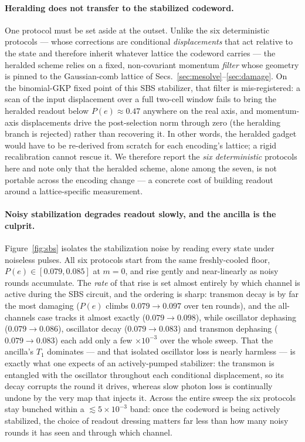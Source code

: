 \documentclass[11pt]{article}
\begin{document}
\paragraph{Heralding does not transfer to the stabilized codeword.} One protocol must be set
aside at the outset. Unlike the six deterministic protocols --- whose corrections are conditional
\emph{displacements} that act relative to the state and therefore inherit whatever lattice the
codeword carries --- the heralded scheme relies on a fixed, non-covariant momentum \emph{filter}
whose geometry is pinned to the Gaussian-comb lattice of Secs.~\ref{sec:mesolve}--\ref{sec:damage}.
On the binomial-GKP fixed point of this SBS stabilizer, that filter is mis-registered: a
scan of the input displacement over a full two-cell window fails to bring the heralded readout below
$P(e)\approx0.47$ anywhere on the real axis, and momentum-axis displacements drive the
post-selection norm through zero (the heralding branch is rejected) rather than recovering it. In
other words, the heralded gadget would have to be re-derived from scratch for each encoding's
lattice; a rigid recalibration cannot rescue it. We therefore report the \emph{six deterministic}
protocols here and note only that the heralded scheme, alone among the seven, is not portable across
the encoding change --- a concrete cost of building readout around a lattice-specific measurement.

\paragraph{Noisy stabilization degrades readout slowly, and the ancilla is the culprit.}
Figure~\ref{fig:sbs} isolates the stabilization noise by reading every state under noiseless
pulses. All six protocols start from the same freshly-cooled floor, $P(e)\in[0.079,0.085]$ at
$m=0$, and rise gently and near-linearly as noisy rounds accumulate. The \emph{rate} of that rise
is set almost entirely by which channel is active during the SBS circuit, and the ordering is
sharp: transmon decay is by far the most damaging ($P(e)$ climbs $0.079\!\to\!0.097$ over ten
rounds), and the all-channels case tracks it almost exactly ($0.079\!\to\!0.098$), while
oscillator dephasing ($0.079\!\to\!0.086$), oscillator decay ($0.079\!\to\!0.083$) and transmon
dephasing ($0.079\!\to\!0.083$) each add only a few $\times10^{-3}$ over the whole sweep. That the
ancilla's $T_1$ dominates --- and that isolated oscillator loss is nearly harmless --- is exactly
what one expects of an actively-pumped stabilizer: the transmon is entangled with the oscillator
throughout each conditional displacement, so its decay corrupts the round it drives, whereas slow
photon loss is continually undone by the very map that injects it. Across the entire sweep the six
protocols stay bunched within a $\lesssim5\times10^{-3}$ band: once the codeword is being actively
stabilized, the choice of readout dressing matters far less than how many noisy rounds it has seen
and through which channel.
\end{document}
